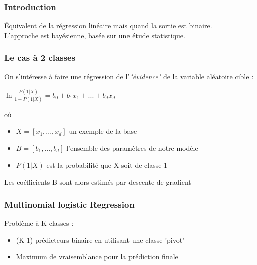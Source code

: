 \begin{frame}
  \frametitle{Introduction}
  Équivalent de la régression linéaire mais quand la sortie est binaire. \\
  L'approche est bayésienne, basée sur une étude statistique. \\
\end{frame}

\begin{frame}
  \frametitle{Le cas à 2 classes}
  On s'intéresse à faire une régression de l'\textit{"évidence"} de la variable aléatoire cible : 
  \begin{center}
    $\ln {\frac {P(1\vert X)}{1-P(1\vert X)}}=b_{0}+b_{1}x_{1}+...+b_{d}x_{d}$
  \end{center}
  où 
  \begin{itemize}
  \item $X = [x_1, ... , x_d]$ un exemple de la base
  \item $B = [b_1, ... , b_d]$ l'ensemble des paramètres de notre modèle
  \item $P(1\vert X)$ est la probabilité que X soit de classe 1
  \end{itemize}
  Les coéfficients B sont alors estimés par descente de gradient
\end{frame}

\begin{frame}
  \frametitle{Multinomial logistic Regression}
  Problème à K classes :
  \begin{itemize}
  \item (K-1) prédicteurs binaire en utilisant une classe 'pivot'
  \item Maximum de vraisemblance pour la prédiction finale
  \end{itemize}
\end{frame}
